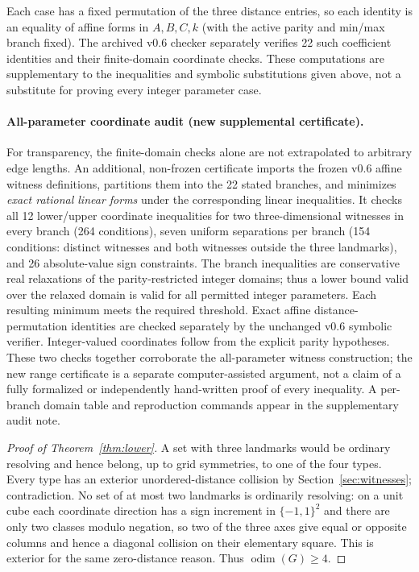 \documentclass[10pt,a4paper]{article}
\newcommand{\odim}{\operatorname{odim}}
\begin{document}
Each case has a fixed permutation of the three distance entries, so each identity is an equality of affine forms in $A,B,C,k$ (with the active parity and min/max branch fixed). The archived v0.6 checker separately verifies 22 such coefficient identities and their finite-domain coordinate checks. These computations are supplementary to the inequalities and symbolic substitutions given above, not a substitute for proving every integer parameter case.

\paragraph{All-parameter coordinate audit (new supplemental certificate).}
For transparency, the finite-domain checks alone are not extrapolated to arbitrary
edge lengths.  An additional, non-frozen certificate
 imports the frozen v0.6 affine
witness definitions, partitions them into the 22 stated branches, and minimizes
\emph{exact rational linear forms} under the corresponding linear inequalities.
It checks all 12 lower/upper coordinate inequalities for two three-dimensional
witnesses in every branch (264 conditions), seven uniform separations per
branch (154 conditions: distinct witnesses and both witnesses outside the three
landmarks), and 26 absolute-value sign constraints.  The branch inequalities
are conservative real relaxations of the parity-restricted integer domains;
thus a lower bound valid over the relaxed domain is valid for all permitted
integer parameters.  Each resulting minimum meets the required threshold.
Exact affine distance-permutation identities are checked separately by the
unchanged v0.6 symbolic verifier.  Integer-valued coordinates follow from the
explicit parity hypotheses.  These two checks together corroborate the
all-parameter witness construction; the new range certificate is a separate
computer-assisted argument, not a claim of a fully formalized or independently
hand-written proof of every inequality.  A per-branch domain table and
reproduction commands appear in the supplementary audit note.

\begin{proof}[Proof of Theorem~\ref{thm:lower}]
A set with three landmarks would be ordinary resolving and hence belong, up to grid symmetries, to one of the four types. Every type has an exterior unordered-distance collision by Section~\ref{sec:witnesses}; contradiction. No set of at most two landmarks is ordinarily resolving: on a unit cube each coordinate direction has a sign increment in $\{-1,1\}^2$ and there are only two classes modulo negation, so two of the three axes give equal or opposite columns and hence a diagonal collision on their elementary square. This is exterior for the same zero-distance reason. Thus $\odim(G)\ge4$.
\end{proof}
\end{document}
